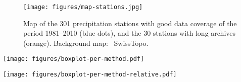 \documentclass{ametsoc}
\begin{document}
	
	
	
	
	
	
	
	\begin{figure}[t]
		\noindent\texttt{[image: figures/map-stations.jpg]}\\
		\caption{Map of the 301 precipitation stations with good data coverage of the period 1981--2010 (blue dots), and the 30 stations with long archives (orange). Background map: \textcopyright\ SwissTopo.}
		\label{fig:stations}
	\end{figure}
	
	\begin{figure*}[t]
		\noindent\texttt{[image: figures/boxplot-per-method.pdf]}\\
		\caption{CRPSS scores for all stations, and for all considered AMs and reanalysis datasets on the VP. A higher CRPSS score means better performance. The parameters of the AMs were calibrated for every station, every dataset, and every method. The boxes show the 25th, 50th, and 75th percentiles. The whiskers extend to the most extreme data point which is no more than 1.5 times the interquartile range.}
		\label{fig:comparison_values}
	\end{figure*}
	
	\begin{figure*}[t]
		\noindent\texttt{[image: figures/boxplot-per-method-relative.pdf]}\\
		\caption{Impact of the reanalysis dataset on performance, isolated by processing the improvement in CRPSS for one dataset compared to the mean performance on all datasets, per station and per method. Note that the methods cannot be compared here, only the datasets. Same conventions as Fig. \ref{fig:comparison_values}.}
		\label{fig:comparison_relative}
	\end{figure*}
	
\end{document}

